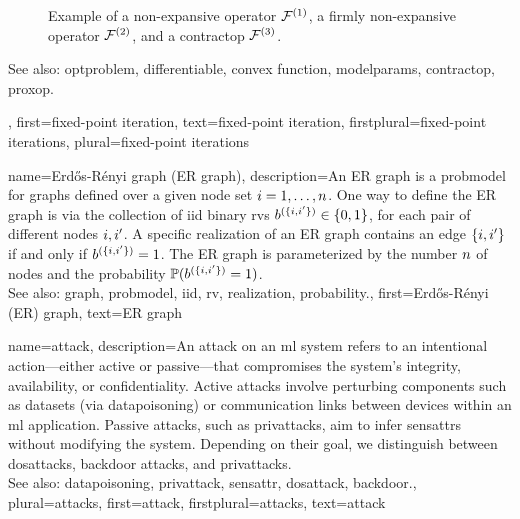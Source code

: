 {{\begin{figure}[H]
\begin{center}
			\end{center} 
			\caption{Example of a non-expansive operator $\mathcal{F}^{(1)}$, a firmly non-expansive operator $\mathcal{F}^{(2)}$, and 
				a \gls{contractop} $\mathcal{F}^{(3)}$. \label{fig_examples_nonexp_dict}}
		\end{figure} 
		See also: \gls{optproblem}, \gls{differentiable}, \gls{convex} \gls{function}, \gls{modelparams}, \gls{contractop}, \gls{proxop}.},
	first={fixed-point iteration},
	text={fixed-point iteration},
	firstplural={fixed-point iterations}, 
	plural={fixed-point iterations}
}


{name={Erd\H{o}s-R\'enyi graph (ER graph)},
	description={An ER  \gls{graph} is a \gls{probmodel} for \glspl{graph} defined over 
		a given node set $i=1, \ldots, n$. One way to define the ER \gls{graph} is 
		via the collection of \gls{iid} binary \glspl{rv} $b^{(\{i,i'\})} \in \{0,1\}$, 
		for each pair of different nodes $i, i'$. A specific \gls{realization}  
		of an ER \gls{graph} contains an edge $\{i,i'\}$ if and only if 
		$b^{(\{i,i'\})}=1$. The ER \gls{graph} is parameterized by the 
		number $n$ of nodes and the \gls{probability} $\mathbb{P}({b^{(\{i,i'\})}=1})$. 
		\\
		See also: \gls{graph}, \gls{probmodel}, \gls{iid}, \gls{rv}, \gls{realization}, \gls{probability}.},
	first={Erd\H{o}s-R\'enyi (ER) graph},
	text={ER graph}
}

{name={attack},  
	description={An attack on an \gls{ml} system refers to an intentional action—either 
		active or passive—that compromises the system's integrity, availability, or confidentiality. 
		Active attacks involve perturbing components such as \glspl{dataset} (via \gls{datapoisoning}) 
		or communication links between \glspl{device} within an \gls{ml} application. Passive attacks, 
		such as \glspl{privattack}, aim to infer \glspl{sensattr} without modifying the system. 
		Depending on their goal, we distinguish between \glspl{dosattack}, \gls{backdoor} attacks, and \glspl{privattack}.
		\\
		See also: \gls{datapoisoning}, \gls{privattack}, \gls{sensattr}, \gls{dosattack}, \gls{backdoor}.},
	plural={attacks}, 
	first={attack},
	firstplural={attacks},
	text={attack}
}

